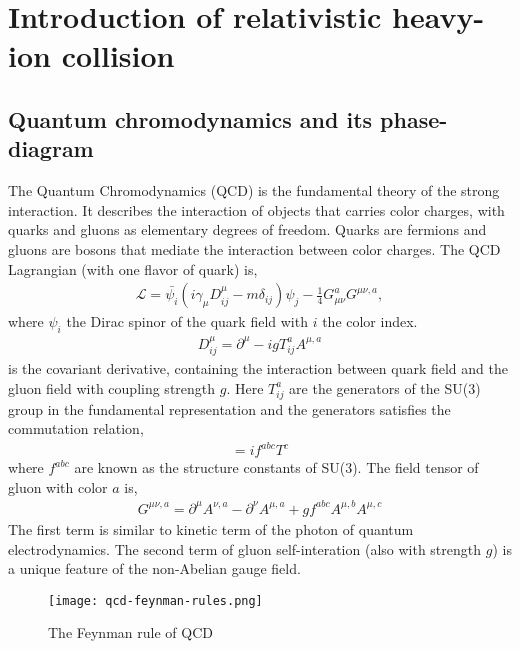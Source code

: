 \chapter{Introduction of relativistic heavy-ion collision}
\section{Quantum chromodynamics and its phase-diagram}
The Quantum Chromodynamics (QCD) is the fundamental theory of the strong interaction.
It describes the interaction of objects that carries color charges, with
quarks and gluons as elementary degrees of freedom. 
Quarks are fermions and gluons are bosons that mediate the interaction between color charges.
The QCD Lagrangian (with one flavor of quark) is,
\begin{eqnarray}
\mathcal{L} = \bar{\psi_i} \left(i\gamma_\mu D^\mu_{ij} -m \delta_{ij} \right)\psi_j - \frac{1}{4}G_{\mu\nu}^a G^{\mu\nu,a},
\end{eqnarray}
where $\psi_i$ the Dirac spinor of the quark field with $i$ the color index.
\begin{eqnarray}
D_{ij}^\mu = \partial^\mu - i g T_{ij}^a A^{\mu, a}
\end{eqnarray}
is the covariant derivative, containing the interaction between quark field and the gluon field with coupling strength $g$.
Here $T_{ij}^a$ are the generators of the SU(3) group in the fundamental representation and the generators satisfies the commutation relation,
\begin{eqnarray}
[T^a, T^b] = i f^{abc} T^c
\end{eqnarray}
where $f^{abc}$ are known as the structure constants of SU(3).
The field tensor of gluon with color $a$ is,
\begin{eqnarray}
G^{\mu\nu,a} = \partial^\mu A^{\nu, a} - \partial^\nu A^{\mu, a} + g f^{abc} A^{\mu,b}A^{\mu,c}
\end{eqnarray}
The first term is similar to kinetic term of the photon of quantum electrodynamics.
The second term of gluon self-interation (also with strength $g$) is a unique feature of the non-Abelian gauge field.

\begin{figure}
    \centering
    \texttt{[image: qcd-feynman-rules.png]}
    \caption{The Feynman rule of QCD}
    \label{fig:qcd-feynman}
\end{figure}

